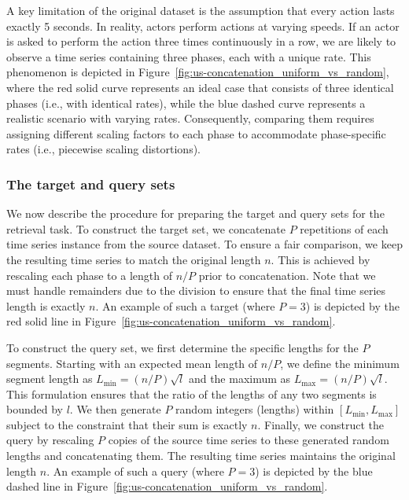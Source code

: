 A key limitation of the original dataset is the assumption that every action lasts exactly 5 seconds. 
In reality, actors perform actions at varying speeds. 
If an actor is asked to perform the action three times continuously in a row, we are likely to observe a time series containing three phases, each with a unique rate. 
This phenomenon is depicted in Figure~\ref{fig:us-concatenation_uniform_vs_random}, where the red solid curve represents an ideal case that consists of three identical phases (i.e., with identical rates), while the blue dashed curve represents a realistic scenario with varying rates.
Consequently, comparing them requires assigning different scaling factors to each phase to accommodate phase-specific rates (i.e., piecewise scaling distortions).

\subsubsection{The target and query sets} %

\noindent{} %
We now describe the procedure for preparing the target and query sets for the retrieval task. 
To construct the target set, we concatenate $P$ repetitions of each time series instance from the source dataset. 
To ensure a fair comparison, we keep the resulting time series to match the original length $n$. 
This is achieved by rescaling each phase to a length of $n/P$ prior to concatenation. 
Note that we must handle remainders due to the division to ensure that the final time series length is exactly $n$.
An example of such a target (where $P=3$) is depicted by the red solid line in Figure~\ref{fig:us-concatenation_uniform_vs_random}.

\noindent{}
To construct the query set, we first determine the specific lengths for the $P$ segments. Starting with an expected mean length of $n/P$, we define the minimum segment length as $L_{\min} = (n/P)\sqrt{l}$ and the maximum as $L_{\max} = (n/P)\sqrt{l}$. 
This formulation ensures that the ratio of the lengths of any two segments is bounded by $l$. 
We then generate $P$ random integers (lengths) within $[L_{\min}, L_{\max}]$ subject to the constraint that their sum is exactly $n$. Finally, we construct the query by rescaling $P$ copies of the source time series to these generated random lengths and concatenating them. The resulting time series maintains the original length $n$. An example of such a query (where $P=3$) is depicted by the blue dashed line in Figure~\ref{fig:us-concatenation_uniform_vs_random}.

